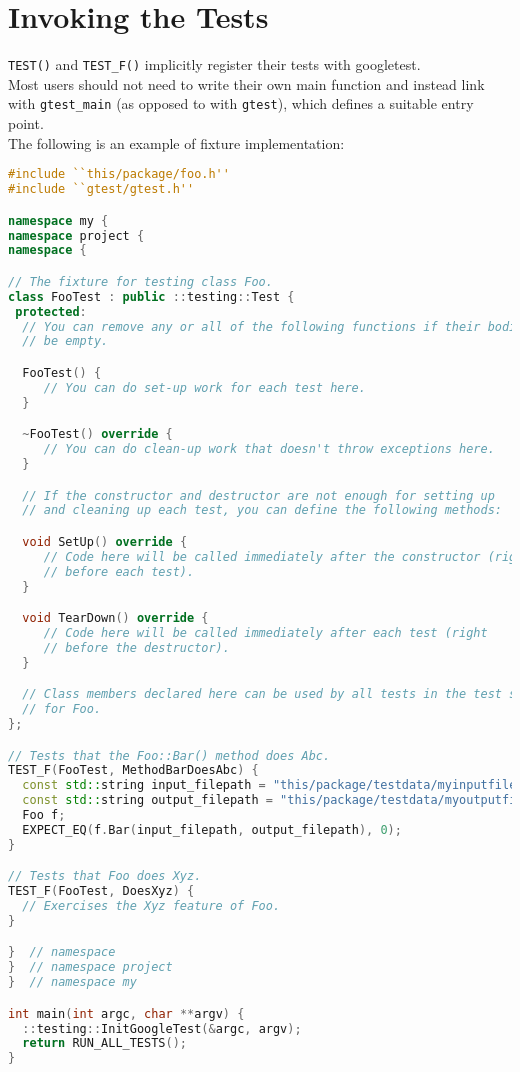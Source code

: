 \documentclass[letterpaper,11pt]{report}
\begin{document}
\section*{Invoking the Tests}
\texttt{TEST()} and \texttt{TEST\_F()} implicitly register their tests with googletest.\\
Most users should not need to write their own main function and instead link with \texttt{gtest\_main} (as 
opposed to with \texttt{gtest}), which defines a suitable entry point.\\
The following is an example of fixture implementation:
\begin{lstlisting}[language=C++]
#include ``this/package/foo.h''
#include ``gtest/gtest.h''

namespace my {
namespace project {
namespace {

// The fixture for testing class Foo.
class FooTest : public ::testing::Test {
 protected:
  // You can remove any or all of the following functions if their bodies would
  // be empty.

  FooTest() {
     // You can do set-up work for each test here.
  }

  ~FooTest() override {
     // You can do clean-up work that doesn't throw exceptions here.
  }

  // If the constructor and destructor are not enough for setting up
  // and cleaning up each test, you can define the following methods:

  void SetUp() override {
     // Code here will be called immediately after the constructor (right
     // before each test).
  }

  void TearDown() override {
     // Code here will be called immediately after each test (right
     // before the destructor).
  }

  // Class members declared here can be used by all tests in the test suite
  // for Foo.
};

// Tests that the Foo::Bar() method does Abc.
TEST_F(FooTest, MethodBarDoesAbc) {
  const std::string input_filepath = "this/package/testdata/myinputfile.dat";
  const std::string output_filepath = "this/package/testdata/myoutputfile.dat";
  Foo f;
  EXPECT_EQ(f.Bar(input_filepath, output_filepath), 0);
}

// Tests that Foo does Xyz.
TEST_F(FooTest, DoesXyz) {
  // Exercises the Xyz feature of Foo.
}

}  // namespace
}  // namespace project
}  // namespace my

int main(int argc, char **argv) {
  ::testing::InitGoogleTest(&argc, argv);
  return RUN_ALL_TESTS();
}
\end{lstlisting}
\end{document}
